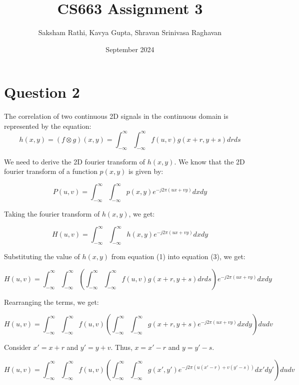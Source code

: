 \documentclass[12pt]{article}
\title{{\bf CS663 Assignment 3}}
\author{Saksham Rathi, Kavya Gupta, Shravan Srinivasa Raghavan}
\date{September 2024}
\begin{document}
\maketitle
\clearpage
\section*{Question 2}
The correlation of two continuous 2D signals in the continuous domain is represented by the equation:
\begin{equation}
    h(x, y) = (f \otimes g)(x, y) = \int_{-\infty}^{\infty} \int_{-\infty}^{\infty} f(u, v)g(x+r, y+s) dr ds
\end{equation}

We need to derive the 2D fourier transform of $h(x, y)$. We know that the 2D fourier transform of a function $p(x, y)$ is given by: 

\begin{equation}
    P(u, v) = \int_{-\infty}^{\infty} \int_{-\infty}^{\infty} p(x, y) e^{-j2\pi(ux+vy)} dx dy
\end{equation}

Taking the fourier transform of $h(x, y)$, we get:

\begin{equation}
    H(u, v) = \int_{-\infty}^{\infty} \int_{-\infty}^{\infty} h(x, y) e^{-j2\pi(ux+vy)} dx dy
\end{equation}

Substituting the value of $h(x, y)$ from equation (1) into equation (3), we get:

\begin{equation}
    H(u, v) = \int_{-\infty}^{\infty} \int_{-\infty}^{\infty} \left( \int_{-\infty}^{\infty} \int_{-\infty}^{\infty} f(u, v)g(x+r, y+s) dr ds \right) e^{-j2\pi(ux+vy)} dx dy
\end{equation}

Rearranging the terms, we get:

\begin{equation}
    H(u, v) = \int_{-\infty}^{\infty} \int_{-\infty}^{\infty} f(u, v) \left( \int_{-\infty}^{\infty} \int_{-\infty}^{\infty} g(x+r, y+s) e^{-j2\pi(ux+vy)} dx dy \right) du dv
\end{equation}


Consider $x' = x + r$ and $y' = y + v$. Thus, $x = x' - r$ and $y = y' - s$.

\begin{equation}
    H(u, v) = \int_{-\infty}^{\infty} \int_{-\infty}^{\infty} f(u, v) \left( \int_{-\infty}^{\infty} \int_{-\infty}^{\infty} g(x', y') e^{-j2\pi(u(x'-r)+v(y'-s))} dx' dy' \right) du dv
\end{equation}
\end{document}
